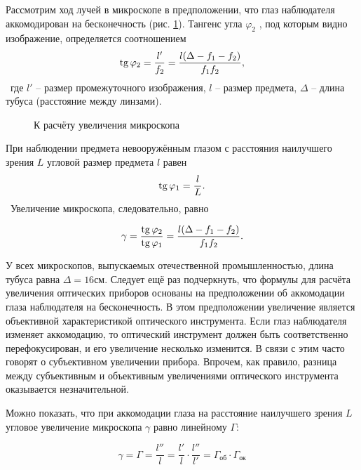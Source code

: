 Рассмотрим ход лучей в микроскопе в предположении, что глаз наблюдателя аккомодирован на
бесконечность (рис. \ref{img::6}). Тангенс угла $\varphi_2$ , под которым видно изображение, определяется
соотношением
\
\begin{equation}\label{eq::5}
  \mathop{\mathrm{tg}}\nolimits \varphi_2 = \frac{l'}{f_2} = \frac{l(\Delta - f_1 - f_2)}{f_1 f_2},
\end{equation}
\
где $l'$ -- размер промежуточного изображения, $l$ -- размер предмета, $\Delta$ -- длина тубуса 
(расстояние между линзами).

\begin{figure}[h]
  \caption{К расчёту увеличения микроскопа}
  \label{img::6}
\end{figure}

При наблюдении предмета невооружённым глазом с расстояния наилучшего зрения $L$ угловой размер 
предмета $l$ равен
\
\begin{equation}
  \mathop{\mathrm{tg}}\nolimits \varphi_1 = \frac{l}{L}.
\end{equation}
\
Увеличение микроскопа, следовательно, равно

\begin{equation}
  \gamma = \frac{\mathop{\mathrm{tg}}\nolimits \varphi_2}{\mathop{\mathrm{tg}}\nolimits \varphi_1} = \frac{l(\Delta - f_1 - f_2)}{f_1 f_2}.
\end{equation}

У всех микроскопов, выпускаемых отечественной промышленностью, длина тубуса равна $\Delta = 16$см.
Следует ещё раз подчеркнуть, что формулы для расчёта увеличения оптических приборов основаны на 
предположении об аккомодации глаза наблюдателя на бесконечность. В этом предположении увеличение 
является объективной характеристикой оптического инструмента. Если глаз наблюдателя изменяет 
аккомодацию, то оптический инструмент должен быть соответственно перефокусирован, и его увеличение 
несколько изменится. В связи с этим часто говорят о субъективном увеличении прибора. Впрочем, 
как правило, разница между субъективным и объективным увеличениями оптического
инструмента оказывается незначительной.

Можно показать, что при аккомодации глаза на расстояние наилучшего зрения $L$ угловое увеличение 
микроскопа $\gamma$ равно линейному $\Gamma$:

\begin{equation}
  \gamma = \Gamma = \frac{l''}{l} = \frac{l'}{l} \cdot \frac{l''}{l'} = 
  \Gamma_{\text{об}} \cdot \Gamma_{\text{ок}}
\end{equation}

